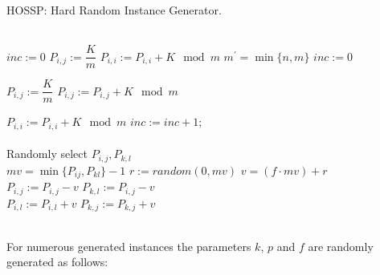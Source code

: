 \documentclass[11pt]{article}
\begin{document}
\begin{algorithm}[H]
    \caption{HOSSP: Hard Random Instance Generator.}\label{algo:hossp}
    \begin{algorithmic}[1]
        \\  
        \State $inc := 0$
         
                    \State $P_{i,j} := \dfrac{K}{m}$
                \State $P_{i,i} := P_{i,i} + K \mod m$
            \EndForEach
        \Else{} 
            \State $m^{\prime} = \min\{n, m\}$
                     $inc := 0$
                \EndIf
     
                \State $P_{i, j} := \dfrac{K}{m}$
                    \State $P_{i, j} := P_{i,j} + K \mod m$
                \EndIf

                    \State $P_{i, i} := P_{i,i} + K \mod m$
                \EndIf
                    \State $inc := inc+1$;
            \EndForEach        
        \EndIf
        \\ 
        \\
            \State Randomly select $P_{i,j}, P_{k,l}$                                
        \EndWhile
        \\
        \State $mv =  \min\{P_{ij},P_{kl}\}-1$ 
        \State $r:=random(0, mv)$ 
        \State $v = (f \cdot mv) + r $ 
        \\
        \State$P_{i,j} := P_{i,j} - v$
        \State$P_{k,l} := P_{i,j} - v$
        \\
        \State$P_{i,l} := P_{i,l} + v$
        \State$P_{k,j} := P_{k,j} + v$
        \\  
        \EndForEach
        \\
      \EndProcedure
    \end{algorithmic}
  \end{algorithm}

For numerous generated instances the parameters $k$, $p$ and $f$ are randomly generated as follows:
\end{document}
